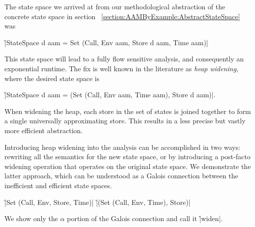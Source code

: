 The state space we arrived at from our methodological abstraction of the
concrete state space in section ~\ref{section:AAMByExample:AbstractStateSpace}
was 
%
\begin{center}
\h|StateSpace d aam = Set (Call, Env aam, Store d aam, Time aam)|
\end{center}
%
This state space will lead to a fully flow sensitive analysis, and consequently
an exponential runtime.
%
The fix is well known in the literature as \textit{heap widening}, where the
desired state space is 
%
\begin{center}
\h|StateSpace d aam = (Set (Call, Env aam, Time aam), Store d aam)|.
\end{center}
%
When widening the heap, each store in the set of states is joined together to
form a single universally approximating store.
%
This results in a less precise but vastly more efficient abstraction.


Introducing heap widening into the analysis can be accomplished in two ways:
rewriting all the semantics for the new state space, or by introducing a
post-facto widening operation that operates on the original state space.
%
We demonstrate the latter approach, which can be understood as a Galois
connection between the inefficient and efficient state spaces.
%
\begin{center}
\h|Set (Call, Env, Store, Time)| 
\galois{\alpha}{\gamma} 
\h|(Set (Call, Env, Time), Store)|
\end{center}
%
We show only the $\alpha$ portion of the Galois connection and call it
\h|widen|.
%
